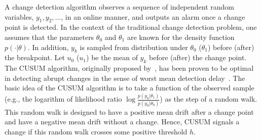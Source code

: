 \documentclass[letterpaper]{article} %
\newcommand{\blue}{}
\begin{document}
A change detection algorithm observes a sequence of independent random variables, $y_1,y_2,\ldots$, in an online manner, and outputs an alarm once a change point is detected. In the context of the traditional change detection problem, one assumes that the parameters $\theta_0$ and $\theta_1$ are known for the density function $p(\cdot|\theta)$. In addition, $y_k$ is sampled from distribution under $\theta_0$ ($\theta_1$) before (after) the breakpoint. Let $u_0$ ($u_1$) be the mean of $y_k$ before (after) the change point. The CUSUM algorithm, originally proposed by~\cite{page1954continuous}, has been proven to be optimal in detecting abrupt changes in the sense of worst mean detection delay~\cite{lorden1971procedures}. 
{\blue The basic idea of the CUSUM algorithm is to take a function of the observed sample (e.g., the logarithm of likelihood ratio $\log\frac{p(y_k|\theta_1)}{p(y_k|\theta_0)}$) as the step of a random walk.}
{\blue This random walk is designed to have a positive mean drift after a change point and have a negative mean drift without a change.}
Hence, {\blue CUSUM signals a change if} this random walk crosses some positive threshold $h$.
\end{document}
